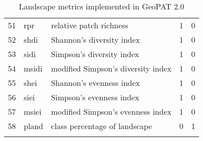 \begin{longtable}{rllrr}
   51 & rpr & relative patch richness &   1 &   0 \\ 
   52 & shdi & Shannon's diversity index &   1 &   0 \\ 
   53 & sidi & Simpson's diversity index &   1 &   0 \\ 
   54 & msidi & modified Simpson's diversity index &   1 &   0 \\ 
   55 & shei & Shannon's evenness index &   1 &   0 \\ 
   56 & siei & Simpson's evenness index &   1 &   0 \\ 
   57 & msiei & modified Simpson's evenness index &   1 &   0 \\ 
   58 & pland & class percentage of landscape &   0 &   1 \\ 
  \hline
\caption{Landscape metrics implemented in GeoPAT 2.0} 
\label{lindtable}
\end{longtable}
